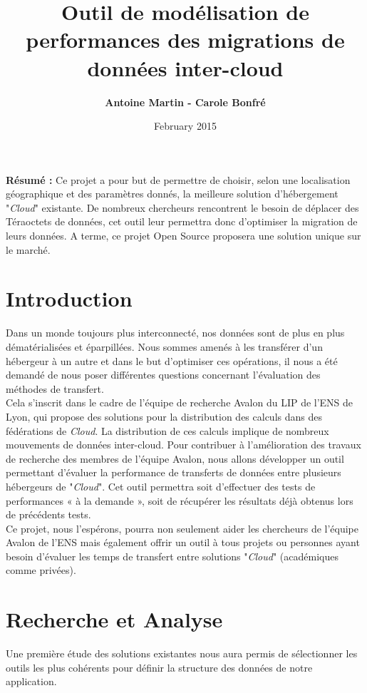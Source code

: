 \documentclass[10pt]{article}
\title{\Huge{Outil de modélisation de performances des migrations de données inter-cloud}}
\author{\textbf{Antoine Martin - Carole Bonfré} }
\date{February 2015}
\begin{document}
\maketitle

\textbf{Résumé : } Ce projet a pour but de permettre de choisir, selon une localisation géographique et des paramètres donnés, la meilleure solution d'hébergement "\textit{Cloud}" existante. De nombreux chercheurs rencontrent le besoin de déplacer des Téraoctets de données, cet outil leur permettra donc d'optimiser la migration de leurs données. A terme, ce projet Open Source proposera une solution unique sur le marché.

\section{Introduction}

Dans un monde toujours plus interconnecté, nos données sont de plus en plus dématérialisées et éparpillées. Nous sommes amenés à les transférer d’un hébergeur à un autre et dans le but d’optimiser ces opérations, il nous a été demandé de nous poser différentes questions concernant l’évaluation des méthodes de transfert.\\

Cela s’inscrit dans le cadre de l’équipe de recherche Avalon du LIP de l’ENS de Lyon, qui propose des solutions pour la distribution des calculs dans des fédérations de \textit{Cloud}. La distribution de ces calculs implique de nombreux mouvements de données inter-cloud. Pour contribuer à l’amélioration des travaux de recherche des membres de l’équipe Avalon, nous allons développer un outil permettant d’évaluer la performance de transferts de données entre plusieurs hébergeurs de "\textit{Cloud}". Cet outil permettra soit d’effectuer des tests de performances « à la demande », soit de récupérer les résultats déjà obtenus lors de précédents tests.\\

Ce projet, nous l’espérons, pourra non seulement aider les chercheurs de l’équipe Avalon de l’ENS mais également offrir un outil à tous projets ou personnes ayant besoin d’évaluer les temps de transfert entre solutions "\textit{Cloud}" (académiques comme privées).

\section{Recherche et Analyse}
Une première étude des solutions existantes nous aura permis de sélectionner les outils les plus cohérents pour définir la structure des données de notre application.
\end{document}
